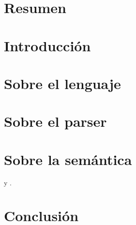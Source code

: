 \documentclass[twoside]{report}
\begin{document}


\chapter*{Resumen}


\tableofcontents

\chapter{Introducción}


\chapter{Sobre el lenguaje}

\chapter{Sobre el parser}



\chapter{Sobre la semántica}
\parencite{Reynolds} y \parencite{MonadicTC}.

\chapter{Conclusión}


\printbibliography
\end{document}
